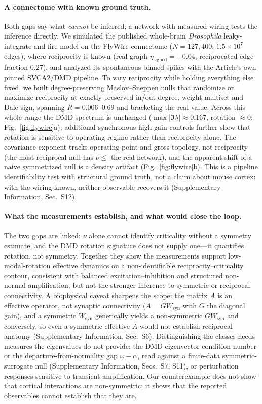 \documentclass[pdflatex,sn-nature]{sn-jnl}
\begin{document}
\paragraph{A connectome with known ground truth.}
Both gaps say what \emph{cannot} be inferred; a network with measured wiring
tests the inference directly. We simulated the published whole-brain
\emph{Drosophila} leaky-integrate-and-fire model\cite{shiu2024} on the FlyWire
connectome ($N=127{,}400$; $1.5\times10^{7}$ edges), where reciprocity is known
(real graph $\eta_{\mathrm{signed}}=-0.04$, reciprocated-edge fraction $0.27$),
and analyzed its spontaneous binned spikes with the Article's own pinned
SVCA2/DMD pipeline. To vary reciprocity while holding everything else fixed, we
built degree-preserving Maslov--Sneppen nulls\cite{maslov2002} that randomize or
maximize reciprocity at exactly preserved in/out-degree, weight multiset and Dale
sign, spanning $R=0.006$--$0.69$ and bracketing the real value. Across this whole
range the DMD spectrum is unchanged ($\max|\Im\lambda|\approx0.167$, rotation
$\approx0$; Fig.~\ref{fig:flywire}a); additional synchronous high-gain controls
further show that rotation is sensitive to operating regime rather than
reciprocity alone. The covariance exponent tracks operating point and
gross topology, not reciprocity (the most reciprocal null has $\nu\le$ the real
network), and the apparent shift of a naive symmetrized null is a density
artifact (Fig.~\ref{fig:flywire}b). This is a pipeline identifiability test with
structural ground truth, not a claim about mouse cortex: with the wiring known,
neither observable recovers it (Supplementary Information, Sec.~S12).

\paragraph{What the measurements establish, and what would close the loop.}
The two gaps are linked: $\nu$ alone cannot identify criticality without a
symmetry estimate, and the DMD rotation signature does not supply one---it
quantifies rotation, not symmetry. Together they show the measurements support
low-modal-rotation effective dynamics on a non-identifiable
reciprocity--criticality contour, consistent with balanced
excitation--inhibition and structured non-normal amplification\cite{murphy2009,
hennequin2014}, but not the stronger inference to symmetric or reciprocal
connectivity. A biophysical caveat sharpens the scope: the matrix $A$ is an
effective operator, not synaptic connectivity ($A=GW_{\mathrm{syn}}$ with $G$ the
diagonal gain), and a symmetric $W_{\mathrm{syn}}$ generically yields a
non-symmetric $GW_{\mathrm{syn}}$ and conversely, so even a symmetric effective
$A$ would not establish reciprocal anatomy (Supplementary Information,
Sec.~S6)\cite{chau2025}. Distinguishing the classes needs measures the
eigenvalues do not provide: the DMD eigenvector condition number or the
departure-from-normality gap $\omega-\alpha$, read against a finite-data
symmetric-surrogate null (Supplementary Information, Secs.~S7, S11), or
perturbation responses sensitive to transient amplification. Our counterexample
does not show that cortical interactions are non-symmetric; it shows that the
reported observables cannot establish that they are.
\end{document}
